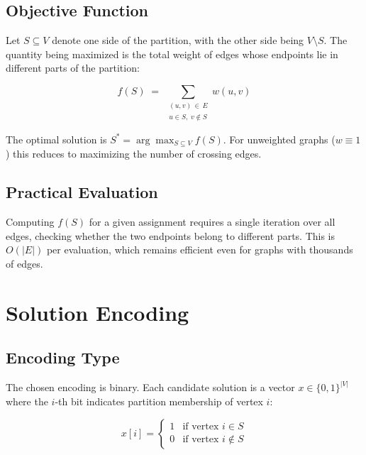 \documentclass[12pt]{article}
\begin{document}
\subsection{Objective Function}
 
Let $S \subseteq V$ denote one side of the partition, with the other side being
$V \setminus S$. The quantity being maximized is the total weight of edges whose
endpoints lie in different parts of the partition:
 
\begin{equation}
    f(S) \;=\; \sum_{\substack{(u,v)\,\in\, E \\ u \in S,\; v \notin S}} w(u, v)
    \label{eq:cut}
\end{equation}
 
The optimal solution is $S^* = \arg\max_{S \subseteq V} f(S)$.
For unweighted graphs ($w \equiv 1$) this reduces to maximizing the number of
crossing edges.
 
\subsection{Practical Evaluation}
 
Computing $f(S)$ for a given assignment requires a single iteration over all edges,
checking whether the two endpoints belong to different parts. This is $O(|E|)$ per
evaluation, which remains efficient even for graphs with thousands of edges.
 
\section{Solution Encoding}
\label{sec:encoding}
 
\subsection{Encoding Type}
 
The chosen encoding is binary. Each candidate solution is a vector
$x \in \{0, 1\}^{|V|}$ where the $i$-th bit indicates partition membership of
vertex $i$:
 
\begin{equation}
    x[i] = \begin{cases} 1 & \text{if vertex } i \in S \\ 0 & \text{if vertex } i \notin S \end{cases}
\end{equation}
 
\end{document}
